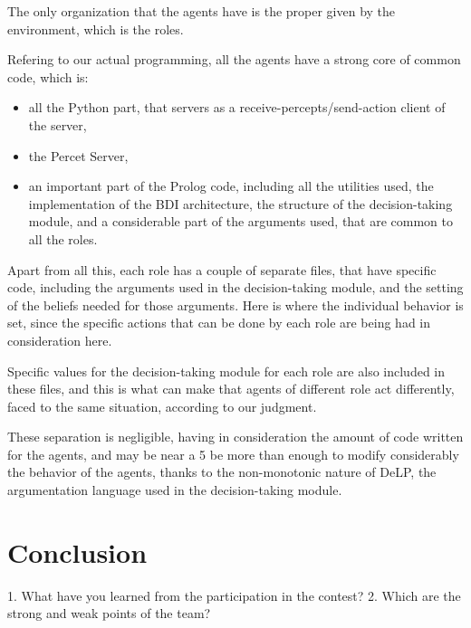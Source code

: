 \documentclass{llncs2e/llncs}
\begin{document}
    The only organization that the agents have is the proper given by the 
    environment, which is the roles. 
    
    Refering to our actual programming, all the agents have a strong core of common
    code, which is:
    \begin{itemize}
        \item all the Python part, that servers as a receive-percepts/send-action client 
        of the server,
        
        \item the Percet Server,
        
        \item an important part of the Prolog code, including all the utilities used, the
        implementation of the BDI architecture, the structure of the 
        decision-taking module, and a considerable part of the arguments used, that
        are common to all the roles.
        
    \end{itemize}
        
    Apart from all this, each role has a couple of separate files, that have 
    specific code, including the arguments used in the decision-taking module, and
    the setting of the beliefs needed for those arguments. Here is where the 
    individual behavior is set, since the specific actions that can be done by each
    role are being had in consideration here.
    
    Specific values for the decision-taking module for each role are also included
    in these files, and this is what can make that agents of different role act 
    differently, faced to the same situation, according to our judgment.
    
    These separation is negligible, having in consideration the amount of code 
    written for the agents, and may be near a 5%
    be more than enough to modify considerably the behavior of the agents, thanks to
    the non-monotonic nature of DeLP, the argumentation language used in the 
    decision-taking module.


\section{Conclusion}

1. What have you learned from the participation in the contest?
2. Which are the strong and weak points of the team?
\end{document}
